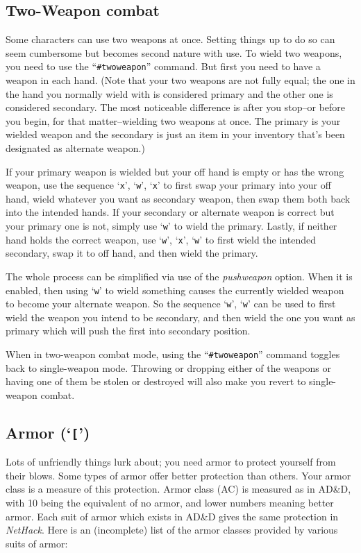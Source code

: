\subsection*{Two-Weapon combat}

Some characters can use two weapons at once.  Setting things up to
do so can seem cumbersome but becomes second nature with use.
To wield two weapons, you need to use the ``{\tt \#twoweapon}'' command.
But first you need to have a weapon in each hand.
(Note that your two weapons are not fully equal; the one in the
hand you normally wield with is considered primary and the other
one is considered secondary.  The most noticeable difference is   
after you stop--or before you begin, for that matter--wielding
two weapons at once.  The primary is your wielded weapon and the
secondary is just an item in your inventory that's been designated
as alternate weapon.)

If your primary weapon is wielded but your off hand is empty or has
the wrong weapon, use the sequence `{\tt x}', `{\tt w}', `{\tt x}' to first swap your
primary into your off hand, wield whatever you want as secondary
weapon, then swap them both back into the intended hands.
If your secondary or alternate weapon is correct but your primary
one is not, simply use `{\tt w}' to wield the primary.
Lastly, if neither hand holds the correct weapon, use `{\tt w}', `{\tt x}', `{\tt w}'
to first wield the intended secondary, swap it to off hand, and then
wield the primary.

The whole process can be simplified via use of the
{\it pushweapon\/}
option.  When it is enabled, then using `{\tt w}' to wield something
causes the currently wielded weapon to become your alternate weapon.
So the sequence `{\tt w}', `{\tt w}' can be used to first wield the weapon you
intend to be secondary, and then wield the one you want as primary
which will push the first into secondary position.

When in two-weapon combat mode, using the ``{\tt \#twoweapon}'' command
toggles back to single-weapon mode.  Throwing or dropping either of the
weapons or having one of them be stolen or destroyed will also make you
revert to single-weapon combat.

\subsection*{Armor (`{\tt [}')}

Lots of unfriendly things lurk about; you need armor to protect
yourself from their blows.  Some types of armor offer better
protection than others.  Your armor class is a measure of this
protection.  Armor class (AC) is measured as in AD\&D, with 10 being
the equivalent of no armor, and lower numbers meaning better armor.
Each suit of armor which exists in AD\&D gives the same protection in
{\it NetHack}.  Here is an (incomplete) list of the armor classes provided by
various suits of armor:

